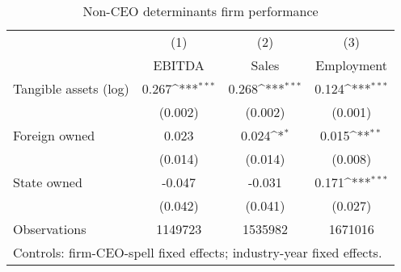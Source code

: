 \begin{table}[htbp]\centering
\def\sym#1{\ifmmode^{#1}\else\(^{#1}\)\fi}
\caption{Non-CEO determinants firm performance}
\begin{tabular}{l*{3}{c}}
\hline\hline
                    &\multicolumn{1}{c}{(1)}&\multicolumn{1}{c}{(2)}&\multicolumn{1}{c}{(3)}\\
                    &\multicolumn{1}{c}{EBITDA}&\multicolumn{1}{c}{Sales}&\multicolumn{1}{c}{Employment}\\
\hline
Tangible assets (log)&       0.267\sym{***}&       0.268\sym{***}&       0.124\sym{***}\\
                    &     (0.002)         &     (0.002)         &     (0.001)         \\
[1em]
Foreign owned       &       0.023         &       0.024\sym{*}  &       0.015\sym{**} \\
                    &     (0.014)         &     (0.014)         &     (0.008)         \\
[1em]
State owned         &      -0.047         &      -0.031         &       0.171\sym{***}\\
                    &     (0.042)         &     (0.041)         &     (0.027)         \\
\hline
Observations        &     1149723         &     1535982         &     1671016         \\
\hline\hline
\multicolumn{4}{l}{\footnotesize Controls: firm-CEO-spell fixed effects; industry-year fixed effects.}\\
\end{tabular}
\end{table}
